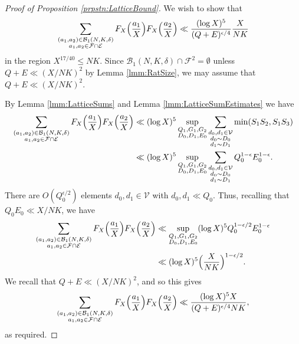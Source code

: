 \documentclass[10pt]{amsart}
\theoremstyle{plain}
\numberwithin{sblmm}{thrm}
\numberwithin{equation}{section}
\begin{document}
\begin{proof}[Proof of Proposition \ref{prpstn:LatticeBound}]
%
We wish to show that
\[
\sum_{\substack{(a_1,a_2)\in\mathcal{B}_1(N,K,\delta)\\ a_1,a_2\in\mathcal{F}\cap\mathcal{E}}}F_X\Bigl(\frac{a_1}{X}\Bigr)F_X\Bigl(\frac{a_2}{X}\Bigr)
\ll \frac{(\log{X})^5}{(Q+E)^{\epsilon/4}}\frac{X}{N K}
\]
in the region $X^{17/40}\le N K$. Since $\mathcal{B}_1(N,K,\delta)\cap \mathcal{F}^2=\emptyset$ unless $Q+E\ll (X/N K)^2$ by Lemma \ref{lmm:RatSize}, we may assume that $Q+E\ll (X/NK)^2$.

By Lemma \ref{lmm:LatticeSums} and Lemma \ref{lmm:LatticeSumEstimates} we have
\begin{align*}
\sum_{\substack{(a_1,a_2)\in\mathcal{B}_1(N,K,\delta)\\ a_1,a_2\in\mathcal{F}\cap\mathcal{E}}}F_X\Bigl(\frac{a_1}{X}\Bigr)F_X\Bigl(\frac{a_2}{X}\Bigr)
&\ll (\log{X})^5\sup_{\substack{Q_1,G_1,G_2\\ D_0,D_1,E_0}}\sum_{\substack{d_0,d_1\in\mathcal{V}\\ d_0\sim D_0\\ d_1\sim D_1}} \min(S_1S_2,S_1S_3)\\
&\ll  (\log{X})^5 \sup_{\substack{Q_1,G_1,G_2\\ D_0,D_1,E_0}} \sum_{\substack{d_0,d_1\in\mathcal{V}\\ d_0\sim D_0\\ d_1\sim D_1}}Q_0^{1-\epsilon}E_0^{1-\epsilon}.
\end{align*}
There are $O(Q_0^{\epsilon/2})$ elements $d_0,d_1\in\mathcal{V}$ with $d_0,d_1\ll Q_0$. Thus, recalling that $Q_0E_0\ll X/N K$, we have
\begin{align*}
\sum_{\substack{(a_1,a_2)\in\mathcal{B}_1(N,K,\delta) \\ a_1,a_2\in\mathcal{F}\cap\mathcal{E} }}F_X\Bigl(\frac{a_1}{X}\Bigr)F_X\Bigl(\frac{a_2}{X}\Bigr)&\ll \sup_{\substack{Q_1,G_1,G_2\\ D_0,D_1,E_0}}(\log{X})^5Q_0^{1-\epsilon/2}E_0^{1-\epsilon}\\
&\ll (\log{X})^5\Bigl(\frac{ X}{ N K}\Bigr)^{1-\epsilon/2}.
\end{align*}
We recall that $Q+E\ll (X/N K)^2$, and so this gives
\[
\sum_{\substack{(a_1,a_2)\in\mathcal{B}_1(N,K,\delta) \\ a_1,a_2\in\mathcal{F}\cap\mathcal{E} }}F_X\Bigl(\frac{a_1}{X}\Bigr)F_X\Bigl(\frac{a_2}{X}\Bigr)\ll \frac{(\log{X})^5 X}{(Q+E)^{\epsilon/4}N K},
\]
as required.
%
\end{proof}
%
%
%
%
%
%
%
\end{document}
